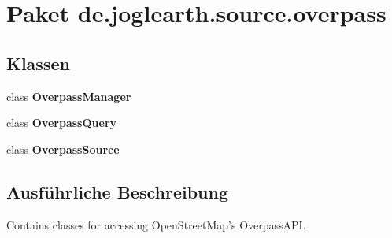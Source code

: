 \section{Paket de.\-joglearth.\-source.\-overpass}
\label{namespacede_1_1joglearth_1_1source_1_1overpass}
\subsection*{Klassen}
\begin{DoxyCompactItemize}
\item 
class {\bf Overpass\-Manager}
\item 
class {\bf Overpass\-Query}
\item 
class {\bf Overpass\-Source}
\end{DoxyCompactItemize}


\subsection{Ausführliche Beschreibung}
Contains classes for accessing Open\-Street\-Map's Overpass\-A\-P\-I. 